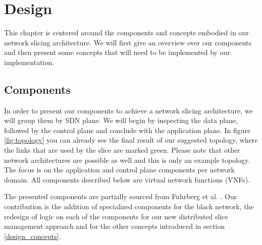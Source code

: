 \chapter{Design}
\label{design}

This chapter is centered around the components and concepts embodied in our network slicing architecture. We will first give an overview over our components and then present some concepts that will need to be implemented by our implementation.

\section{Components}
In order to present our components to achieve a network slicing architecture, we will group them by SDN plane. We will begin by inspecting the data plane, followed by the control plane and conclude with the application plane. In figure \ref{fig:topology} you can already see the final result of our suggested topology, where the links that are used by the slice are marked green. Please note that other network architectures are possible as well and this is only an example topology. The focus is on the application and control plane components per network domain. All components described below are virtual network functions (VNFs).

The presented components are partially sourced from Fuhrberg et al. \cite{SE4}. Our contribution is the addition of specialized components for the black network, the redesign of logic on each of the components for our new distributed slice management approach and for the other concepts introduced in section \ref{design_concepts}.


